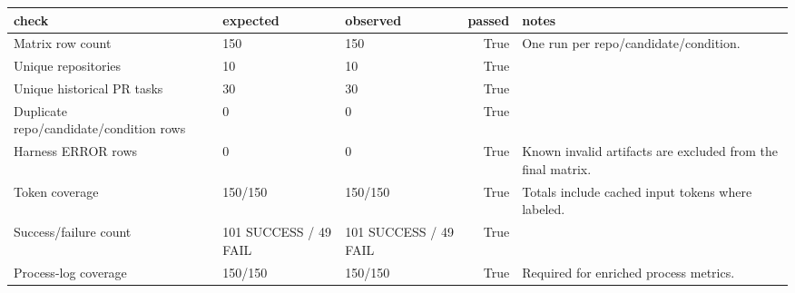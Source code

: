 \begin{tabular}{lllrl}
\toprule
check & expected & observed & passed & notes \\
\midrule
Matrix row count & 150 & 150 & True & One run per repo/candidate/condition. \\
Unique repositories & 10 & 10 & True &  \\
Unique historical PR tasks & 30 & 30 & True &  \\
Duplicate repo/candidate/condition rows & 0 & 0 & True &  \\
Harness ERROR rows & 0 & 0 & True & Known invalid artifacts are excluded from the final matrix. \\
Token coverage & 150/150 & 150/150 & True & Totals include cached input tokens where labeled. \\
Success/failure count & 101 SUCCESS / 49 FAIL & 101 SUCCESS / 49 FAIL & True &  \\
Process-log coverage & 150/150 & 150/150 & True & Required for enriched process metrics. \\
\bottomrule
\end{tabular}
